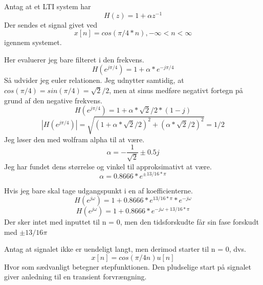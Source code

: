 \begin{EksamensOpgaver}
\begin{Eksamenssæt}[2024 Ordinær]
\begin{eksamensOpgave}
\begin{UnderOpgave}
        \end{UnderOpgave}
        \end{eksamensOpgave}
        \begin{eksamensOpgave}
            Antag at et LTI system har 
            \[H(z) = 1 + \alpha z^{-1}\]
            Der sendes et signal givet ved 
            \[x[n] = cos(\pi/4 * n), -\infty < n < \infty\]
            igennem systemet. 
            \begin{UnderOpgave}
                Her evaluerer jeg bare filteret i den frekvens. 
                \[H(e^{j\pi/4}) = 1 + \alpha * e^{-j\pi/4}\]
                Så udvider jeg euler relationen. Jeg udnytter samtidig, at $cos(\pi/4) = sin(\pi/4) = \sqrt{2}/2$, men at sinus medføre negativt fortegn på grund af den negative frekvens.
                \[H(e^{j\pi/4}) = 1 + \alpha * \sqrt{2}/2 * (1 - j)\]
                \[|H(e^{j\pi/4})| = \sqrt{(1 + \alpha * \sqrt{2}/2)^2 + (\alpha * \sqrt{2}/2)^2} = 1/2\]
                Jeg løser den med wolfram alpha til at være. 
                \[\alpha = -\frac{1}{\sqrt{2}} \pm 0.5j\]
                Jeg har fundet dens størrelse og vinkel til approksimativt at være.
                \[\alpha = 0.8666 * e^{\pm 13/16*\pi}\]
            \end{UnderOpgave}
            \begin{UnderOpgave}
                Hvis jeg bare skal tage udgangspunkt i en af koefficienterne.
                \[H(e^{j\omega}) = 1 + 0.8666 * e^{13/16*\pi} * e^{-j\omega}\]
                \[H(e^{j\omega}) = 1 + 0.8666 * e^{-j\omega + 13/16*\pi}\]
                Der sker intet med inputtet til n = 0, men den tidsforskudte får sin fase forskudt med $\pm 13/16\pi$               
            \end{UnderOpgave}
            Antag at signalet ikke er uendeligt langt, men derimod starter til n = 0, dvs.
            \[x[n] = cos(\pi/4 n )u[n]\]
            Hvor  som sædvanligt betegner stepfunktionen. Den pludselige start på signalet giver anledning til en transient forvrængning. 
            \begin{UnderOpgave}
                
            \end{UnderOpgave}
            

\end{eksamensOpgave}
\end{Eksamenssæt}
\end{EksamensOpgaver}
